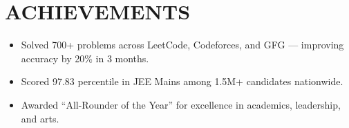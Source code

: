 \documentclass[letterpaper,11pt]{article}
\newcommand{\resumeItem}[1]{\item\small{{#1 \vspace{-2pt}}}}
\newcommand{\resumeSubHeadingListStart}{\begin{itemize}[leftmargin=0.0in, label={}]}
\newcommand{\resumeSubHeadingListEnd}{\end{itemize}}
\newcommand{\resumeItemListStart}{\begin{itemize}[leftmargin=0.15in]}
\newcommand{\resumeItemListEnd}{\end{itemize}\vspace{-5pt}}
\begin{document}
\section{ACHIEVEMENTS}
\resumeSubHeadingListStart
  \resumeItemListStart
    \resumeItem{Solved 700+ problems across LeetCode, Codeforces, and GFG — improving accuracy by 20\% in 3 months.}
    \resumeItem{Scored 97.83 percentile in JEE Mains among 1.5M+ candidates nationwide.}
    \resumeItem{Awarded “All-Rounder of the Year” for excellence in academics, leadership, and arts.}
  \resumeItemListEnd
\resumeSubHeadingListEnd
\end{document}
